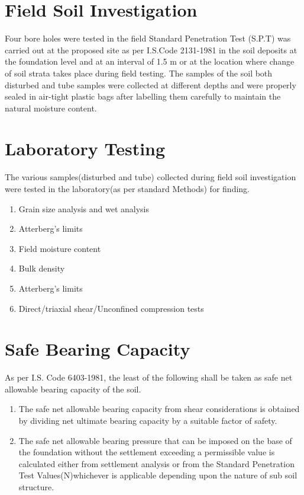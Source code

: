 \documentclass{soil1}
\begin{document}
\section{Field Soil Investigation}
Four bore holes were tested in the field Standard Penetration Test (S.P.T) was carried out at the proposed
site as per I.S.Code 2131-1981 in the soil deposits at the foundation level and at an interval of 1.5 m or at
the location where change of soil strata takes place during field testing. The samples of the soil both
disturbed and tube samples were collected at different depths and were properly sealed in air-tight plastic
bags after labelling them carefully to maintain the natural moisture content.
\section{Laboratory Testing }
The various samples(disturbed and tube) collected during field soil investigation were tested in the laboratory(as per standard Methods) for finding.

\begin{enumerate}
\item{Grain size analysis and wet analysis}
\item{Atterberg's limits}
\item{Field moisture content}
\item{Bulk density}
\item{Atterberg's limits}
\item{Direct/triaxial shear/Unconfined compression tests}
\end{enumerate}
\section{Safe Bearing Capacity }
As per I.S. Code 6403-1981, the least of the following shall be taken as safe net allowable bearing
capacity of the soil.
\begin{enumerate}
\item{The safe net allowable bearing capacity from shear considerations is obtained by dividing net
ultimate bearing capacity by a suitable factor of safety.}
\item{The safe net allowable bearing pressure that can be imposed on the base of the foundation
without the settlement exceeding a permissible value is calculated either from settlement
analysis or from the Standard Penetration Test Values(N)whichever is applicable depending
upon the nature of sub soil structure.}
\end{enumerate}
\end{document}
